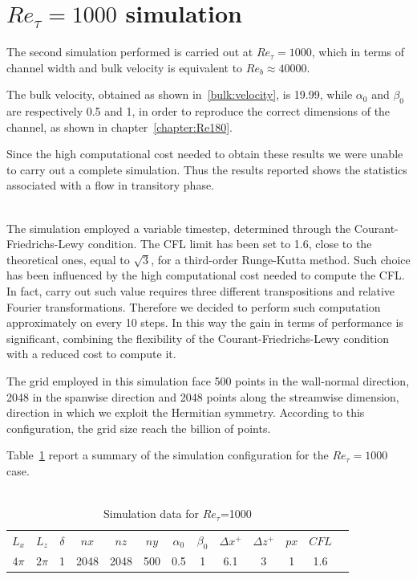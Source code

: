 \section{$Re_{\tau}=1000$ simulation} 
The second simulation performed is carried out at $Re_{\tau}=1000$, which in terms of channel width and bulk velocity is equivalent to $Re_{b}\approx40000$.\par
The bulk velocity, obtained as shown in~\ref{bulk:velocity}, is 19.99, while $\alpha_{0}$ and $\beta_{0}$ are respectively 0.5 and 1, in order to reproduce the correct dimensions of the channel, as shown in chapter~\ref{chapter:Re180}.\par
Since the high computational cost needed to obtain these results we were unable to carry out a complete simulation. Thus the results reported shows the statistics associated with a flow in transitory phase. \\~\par

The simulation employed a variable timestep, determined through the Courant-Friedrichs-Lewy condition.
The CFL limit has been set to 1.6, close to the theoretical ones, equal to $\sqrt{3}$, for a third-order Runge-Kutta method. Such choice has been influenced by the high computational cost needed to compute the CFL. In fact, carry out such value requires three different transpositions and relative Fourier transformations. Therefore we decided to perform such computation approximately on every 10 steps. In this way the gain in terms of performance is significant, combining the flexibility of the Courant-Friedrichs-Lewy condition with a reduced cost to compute it.\par

The grid employed in this simulation face 500 points in the wall-normal direction, 2048 in the spanwise direction and 2048 points along the streamwise dimension, direction in which we exploit the Hermitian symmetry. According to this configuration, the grid size reach the billion of points.\par
Table~\ref{table:1000} report a summary of the simulation configuration for the $Re_{\tau}=1000$ case.\\~\par

\begin{table}
\caption{Simulation data for $Re_{\tau}$=1000}
\begin{center}
\begin{tabular}{ccccccccccccc}
\toprule
$L_{x}$ & $L_{z}$ & $\delta$ & $nx$ & $nz$ & $ny$ & $\alpha_{0}$ & $\beta_{0}$ & $\Delta x^{+}$ & $\Delta z^{+}$ & $px$ & $CFL$\\
$4\pi$ & $2\pi$ & 1 & 2048 & 2048 & 500 & 0.5 & 1 & 6.1  & 3 & 1 & 1.6 \\
\bottomrule
\end{tabular}
\end{center}
\label{table:1000}
\end{table}


